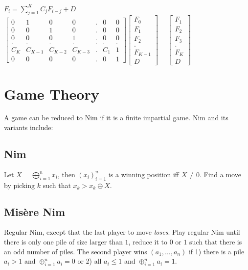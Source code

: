 $F_i = \sum_{j=1}^{K} C_j F_{i-j} + D$\\

{   
  \scriptsize
  $\begin{bmatrix}
    0 & 1 & 0 & 0 & . & 0 & 0\\
    0 & 0 & 1 & 0 & . & 0 & 0\\
    0 & 0 & 0 & 1 & . & 0 & 0\\
    . & . & . & . & . & . & .\\
    C_K & C_{K-1} & C_{K-2} & C_{K-3} & . & C_{1} & 1\\
    0 & 0 & 0 & 0 & . & 0 & 1
  \end{bmatrix} 
  \begin{bmatrix}
  F_0\\
  F_1\\
  F_2\\
  .\\
  F_{K-1}\\
  D
  \end{bmatrix} =
  \begin{bmatrix}
    F_1\\
    F_2\\
    F_3\\
    .\\
    F_K\\
    D
  \end{bmatrix}$
}

\section{Game Theory}
A game can be reduced to Nim if it is a finite impartial game.
Nim and its variants include:

\subsection{Nim}
	Let $X = \bigoplus_{i=1}^n x_i$, then $(x_i)_{i=1}^n$ is a winning position iff $X\neq 0$. Find a move by picking $k$ such that $x_k > x_k \oplus X$.
	
\subsection{Mis\`{e}re Nim} 
    Regular Nim, except that the last player to move \textit{loses}. Play regular Nim until there is only one pile of size larger than $1$, reduce it to $0$ or $1$ such that there is an odd number of piles. The second player wins $(a_1, \dots, a_n)$ if 1) there is a pile $a_i > 1$ and $\oplus_{i=1}^{n} a_i = 0$ or 2) all $a_i \leq 1$ and $\oplus_{i=1}^{n} a_i = 1$.

